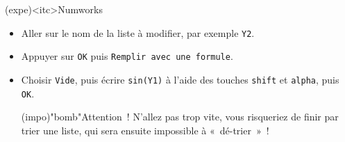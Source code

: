 \documentclass[a4paper, 12pt, garamond]{book}
\begin{document}
\begin{tcn}(expe)<itc>{Numworks}
	\begin{itemize}
	  \item Aller sur le nom de la liste à modifier, par exemple \texttt{Y2}.
    \item Appuyer sur \texttt{OK} puis \texttt{Remplir avec une formule}.
    \item Choisir \texttt{Vide}, puis écrire \texttt{sin(Y1)} à l'aide des
      touches \texttt{shift} et \texttt{alpha}, puis \texttt{OK}.
      \begin{center}
        \begin{tcn}[width=.8\linewidth](impo)"bomb"{Attention~!}
          N'allez pas trop vite, vous risqueriez de finir par trier une liste,
          qui sera ensuite impossible à «~dé-trier~»~!
        \end{tcn}
      \end{center}
	\end{itemize}
\end{tcn}
\vspace{-15pt}
\end{document}
